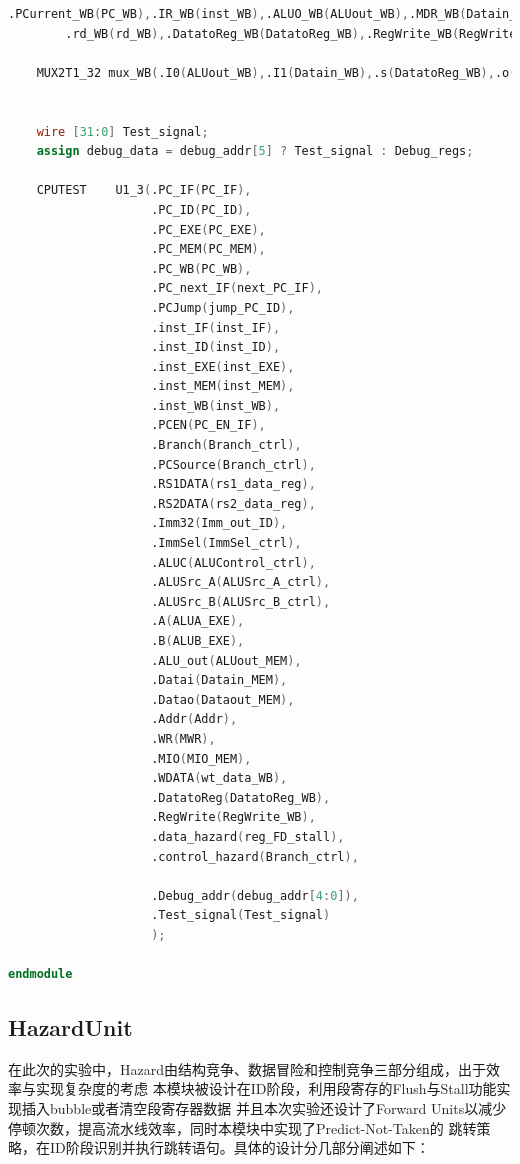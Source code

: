 \begin{lstlisting}[language = {verilog}]
        .PCurrent_WB(PC_WB),.IR_WB(inst_WB),.ALUO_WB(ALUout_WB),.MDR_WB(Datain_WB),
        .rd_WB(rd_WB),.DatatoReg_WB(DatatoReg_WB),.RegWrite_WB(RegWrite_WB));
    
    MUX2T1_32 mux_WB(.I0(ALUout_WB),.I1(Datain_WB),.s(DatatoReg_WB),.o(wt_data_WB));


    wire [31:0] Test_signal;
    assign debug_data = debug_addr[5] ? Test_signal : Debug_regs;
    
    CPUTEST    U1_3(.PC_IF(PC_IF),
                    .PC_ID(PC_ID),
                    .PC_EXE(PC_EXE),
                    .PC_MEM(PC_MEM),
                    .PC_WB(PC_WB),
                    .PC_next_IF(next_PC_IF),
                    .PCJump(jump_PC_ID),
                    .inst_IF(inst_IF),
                    .inst_ID(inst_ID),
                    .inst_EXE(inst_EXE),
                    .inst_MEM(inst_MEM),
                    .inst_WB(inst_WB),
                    .PCEN(PC_EN_IF),
                    .Branch(Branch_ctrl),
                    .PCSource(Branch_ctrl),
                    .RS1DATA(rs1_data_reg),
                    .RS2DATA(rs2_data_reg),
                    .Imm32(Imm_out_ID),
                    .ImmSel(ImmSel_ctrl),
                    .ALUC(ALUControl_ctrl),
                    .ALUSrc_A(ALUSrc_A_ctrl),
                    .ALUSrc_B(ALUSrc_B_ctrl),
                    .A(ALUA_EXE),
                    .B(ALUB_EXE),
                    .ALU_out(ALUout_MEM),
                    .Datai(Datain_MEM),
                    .Datao(Dataout_MEM),
                    .Addr(Addr),
                    .WR(MWR),
                    .MIO(MIO_MEM),
                    .WDATA(wt_data_WB),
                    .DatatoReg(DatatoReg_WB),
                    .RegWrite(RegWrite_WB),
                    .data_hazard(reg_FD_stall),
                    .control_hazard(Branch_ctrl),

                    .Debug_addr(debug_addr[4:0]),
                    .Test_signal(Test_signal)    
                    );

endmodule
\end{lstlisting}

\subsection{HazardUnit}
在此次的实验中，Hazard由结构竞争、数据冒险和控制竞争三部分组成，出于效率与实现复杂度的考虑
本模块被设计在ID阶段，利用段寄存的Flush与Stall功能实现插入bubble或者清空段寄存器数据
并且本次实验还设计了Forward Units以减少停顿次数，提高流水线效率，同时本模块中实现了Predict-Not-Taken的
跳转策略，在ID阶段识别并执行跳转语句。具体的设计分几部分阐述如下：

